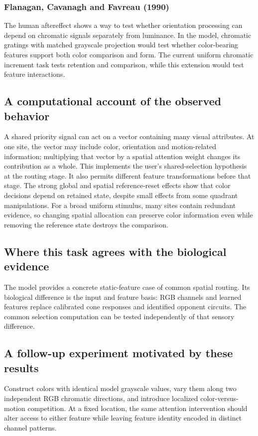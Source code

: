 \documentclass[11pt]{article}
\begin{document}
\subsubsection{Flanagan, Cavanagh and Favreau (1990)}
The human aftereffect shows a way to test whether orientation processing can depend on chromatic signals separately from luminance. In the model, chromatic gratings with matched grayscale projection would test whether color-bearing features support both color comparison and form. The current uniform chromatic increment task tests retention and comparison, while this extension would test feature interactions. \cite{bio_flanagan}

\subsection{A computational account of the observed behavior}
A shared priority signal can act on a vector containing many visual attributes. At one site, the vector may include color, orientation and motion-related information; multiplying that vector by a spatial attention weight changes its contribution as a whole. This implements the user’s shared-selection hypothesis at the routing stage. It also permits different feature transformations before that stage. The strong global and spatial reference-reset effects show that color decisions depend on retained state, despite small effects from some quadrant manipulations. For a broad uniform stimulus, many sites contain redundant evidence, so changing spatial allocation can preserve color information even while removing the reference state destroys the comparison.

\subsection{Where this task agrees with the biological evidence}
The model provides a concrete static-feature case of common spatial routing. Its biological difference is the input and feature basis: RGB channels and learned features replace calibrated cone responses and identified opponent circuits. The common selection computation can be tested independently of that sensory difference.

\subsection{A follow-up experiment motivated by these results}
Construct colors with identical model grayscale values, vary them along two independent RGB chromatic directions, and introduce localized color-versus-motion competition. At a fixed location, the same attention intervention should alter access to either feature while leaving feature identity encoded in distinct channel patterns.
\end{document}
